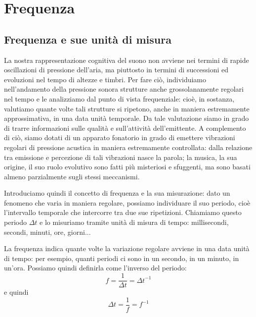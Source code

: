 \documentclass[11pt]{report}
\begin{document}
\chapter{Frequenza}



\section{Frequenza e sue unità di misura}

La nostra rappresentazione cognitiva del suono non avviene nei termini di rapide oscillazioni di pressione dell'aria, ma piuttosto in termini di successioni ed evoluzioni nel tempo di altezze e timbri. Per fare ciò, individuiamo nell'andamento della pressione sonora strutture anche grossolanamente regolari nel tempo e le analizziamo dal punto di vista frequenziale: cioè, in sostanza, valutiamo quante volte tali strutture si ripetono, anche in maniera estremamente approssimativa, in una data unità temporale. Da tale valutazione siamo in grado di trarre informazioni sulle qualità e sull'attività dell'emittente. A complemento di ciò, siamo dotati di un apparato fonatorio in grado di emettere vibrazioni regolari di pressione acustica in maniera estremamente controllata: dalla relazione tra emissione e percezione di tali vibrazioni nasce la parola; la musica, la sua origine, il suo ruolo evolutivo sono fatti più misteriosi e sfuggenti, ma sono basati almeno parzialmente sugli stessi meccanismi.

Introduciamo quindi il concetto di frequenza e la sua misurazione: dato un fenomeno che varia in maniera regolare, possiamo individuare il suo periodo, cioè l'intervallo temporale che intercorre tra due sue ripetizioni. Chiamiamo questo periodo $\Delta t$ e lo misuriamo tramite unità di misura di tempo: millisecondi, secondi, minuti, ore, giorni...

La frequenza indica quante volte la variazione regolare avviene in una data unità di tempo: per esempio, quanti periodi ci sono in un secondo, in un minuto, in un'ora. Possiamo quindi definirla come l'inverso del periodo:
\begin{equation}
f = \frac{1}{\Delta t} = {\Delta t}^{-1}
\end{equation}
e quindi
\begin{equation}
{\Delta t} = \frac{1}{f} = f^{-1}
\end{equation}
\end{document}
